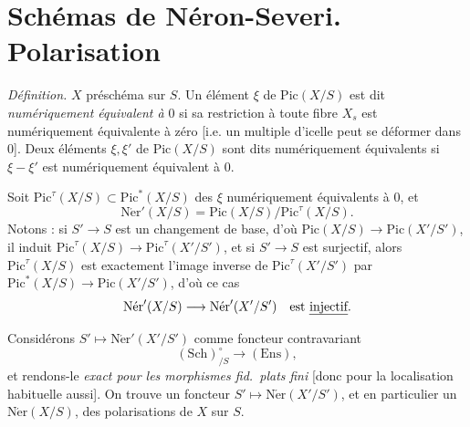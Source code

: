 \documentclass[11pt,a4paper]{article}
\begin{document}
\section{Schémas de Néron-Severi. Polarisation}

\emph{Définition.} $X$ préschéma sur $S$. Un élément $\xi$ de $\mathrm{Pic}(X/S)$ est dit \emph{numériquement équivalent à $0$} si sa restriction à toute fibre $X_s$ est numériquement équivalente à zéro [i.e. un multiple d'icelle peut se déformer dans $0$]. Deux éléments $\xi, \xi'$ de $\mathrm{Pic}(X/S)$ sont dits numériquement équivalents si $\xi - \xi'$ est numériquement équivalent à $0$.

Soit $\mathrm{Pic}^{\tau}(X/S) \subset \mathrm{Pic}^{*}(X/S)$  des $\xi$ numériquement équivalents à $0$, et
\[
\mathrm{N\acute{e}r}'(X/S) = \mathrm{Pic}(X/S)/\mathrm{Pic}^{\tau}(X/S).
\]
Notons : si  $S' \to S$ est un changement de base, d'où $\mathrm{Pic}(X/S) \to \mathrm{Pic}(X'/S')$, il induit $\mathrm{Pic}^{\tau}(X/S) \to \mathrm{Pic}^{\tau}(X'/S')$, et si $S' \to S$ est surjectif, alors  $\mathrm{Pic}^{\tau}(X/S)$ est exactement l'image inverse de $\mathrm{Pic}^{\tau}(X'/S')$ par $\mathrm{Pic}^{*}(X/S) \to \mathrm{Pic}(X'/S')$, d'où  ce cas
\[
\mathrm{N\acute{e}r}'(X/S) \longrightarrow \mathrm{N\acute{e}r}'(X'/S') \quad\text{est \emph{injectif}.}
\]



Considérons $S' \mapsto \mathrm{N\acute{e}r}'(X'/S')$ comme foncteur contravariant
\[
(\mathrm{Sch})^{\circ}_{/S} \longrightarrow (\mathrm{Ens}),
\]
et rendons-le \emph{exact pour les morphismes fid.\ plats}   \emph{fini} [donc pour la localisation habituelle aussi]. On trouve un foncteur $S' \mapsto \mathrm{N\acute{e}r}(X'/S')$, et en particulier un  $\mathrm{N\acute{e}r}(X/S)$,  des polarisations de $X$ sur $S$.
\end{document}
